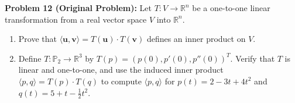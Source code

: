 \documentclass[11pt, letterpaper]{article}
\theoremstyle{definition}
\theoremstyle{remark}
\begin{document}
\medskip

\textbf{Problem 12 (Original Problem):} Let $T : V \to \mathbb{R}^n$ be a one-to-one linear transformation from a real vector space $V$ into $\mathbb{R}^n$.
\begin{enumerate}[label=(\alph*)]
    \item Prove that $\langle \mathbf{u}, \mathbf{v} \rangle = T(\mathbf{u}) \cdot T(\mathbf{v})$ defines an inner product on $V$.
    \item Define $T : \mathbb{P}_2 \to \mathbb{R}^3$ by $T(p) = (p(0), p'(0), p''(0))^T$. Verify that $T$ is linear and one-to-one, and use the induced inner product $\langle p, q \rangle = T(p) \cdot T(q)$ to compute $\langle p, q \rangle$ for $p(t) = 2 - 3t + 4t^2$ and $q(t) = 5 + t - \frac{1}{2}t^2$.
\end{enumerate}
\end{document}
